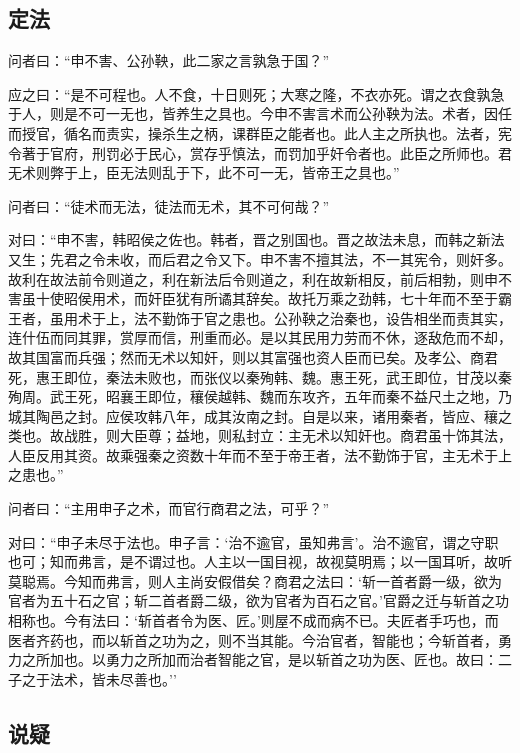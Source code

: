 \documentclass[]{article}
\begin{document}
\hypertarget{header-n1586}{%
\subsection{定法}\label{header-n1586}}

问者曰：``申不害、公孙鞅，此二家之言孰急于国？''

应之曰：``是不可程也。人不食，十日则死；大寒之隆，不衣亦死。谓之衣食孰急于人，则是不可一无也，皆养生之具也。今申不害言术而公孙鞅为法。术者，因任而授官，循名而责实，操杀生之柄，课群臣之能者也。此人主之所执也。法者，宪令著于官府，刑罚必于民心，赏存乎慎法，而罚加乎奸令者也。此臣之所师也。君无术则弊于上，臣无法则乱于下，此不可一无，皆帝王之具也。''

问者曰：``徒术而无法，徒法而无术，其不可何哉？''

对曰：``申不害，韩昭侯之佐也。韩者，晋之别国也。晋之故法未息，而韩之新法又生；先君之令未收，而后君之令又下。申不害不擅其法，不一其宪令，则奸多。故利在故法前令则道之，利在新法后令则道之，利在故新相反，前后相勃，则申不害虽十使昭侯用术，而奸臣犹有所谲其辞矣。故托万乘之劲韩，七十年而不至于霸王者，虽用术于上，法不勤饰于官之患也。公孙鞅之治秦也，设告相坐而责其实，连什伍而同其罪，赏厚而信，刑重而必。是以其民用力劳而不休，逐敌危而不却，故其国富而兵强；然而无术以知奸，则以其富强也资人臣而已矣。及孝公、商君死，惠王即位，秦法未败也，而张仪以秦殉韩、魏。惠王死，武王即位，甘茂以秦殉周。武王死，昭襄王即位，穰侯越韩、魏而东攻齐，五年而秦不益尺土之地，乃城其陶邑之封。应侯攻韩八年，成其汝南之封。自是以来，诸用秦者，皆应、穰之类也。故战胜，则大臣尊；益地，则私封立：主无术以知奸也。商君虽十饰其法，人臣反用其资。故乘强秦之资数十年而不至于帝王者，法不勤饰于官，主无术于上之患也。''

问者曰：``主用申子之术，而官行商君之法，可乎？''

对曰：``申子未尽于法也。申子言：`治不逾官，虽知弗言'。治不逾官，谓之守职也可；知而弗言，是不谓过也。人主以一国目视，故视莫明焉；以一国耳听，故听莫聪焉。今知而弗言，则人主尚安假借矣？商君之法曰：`斩一首者爵一级，欲为官者为五十石之官；斩二首者爵二级，欲为官者为百石之官。'官爵之迁与斩首之功相称也。今有法曰：`斩首者令为医、匠。'则屋不成而病不已。夫匠者手巧也，而医者齐药也，而以斩首之功为之，则不当其能。今治官者，智能也；今斩首者，勇力之所加也。以勇力之所加而治者智能之官，是以斩首之功为医、匠也。故曰：二子之于法术，皆未尽善也。''

\hypertarget{header-n1587}{%
\subsection{说疑}\label{header-n1587}}
\end{document}
